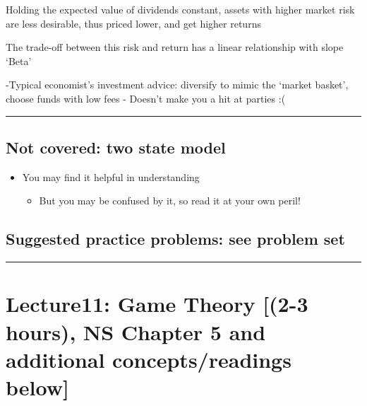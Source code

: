 \documentclass[]{article}
\providecommand{\tightlist}{%
  \setlength{\itemsep}{0pt}\setlength{\parskip}{0pt}}
\begin{document}
\bigskip

Holding the expected value of dividends constant, assets with higher
market risk are less desirable, thus priced lower, and get higher
returns

The trade-off between this risk and return has a linear relationship
with slope `Beta'

\bigskip

-Typical economist's investment advice: diversify to mimic the `market
basket', choose funds with low fees - Doesn't make you a hit at parties
:(

\begin{center}\rule{0.5\linewidth}{\linethickness}\end{center}

\hypertarget{not-covered-two-state-model}{%
\subsection{Not covered: two state
model}\label{not-covered-two-state-model}}

\begin{itemize}
\tightlist
\item
  You may find it helpful in understanding

  \begin{itemize}
  \tightlist
  \item
    But you may be confused by it, so read it at your own peril!
  \end{itemize}
\end{itemize}

\hypertarget{suggested-practice-problems-see-problem-set}{%
\subsection{Suggested practice problems: see problem
set}\label{suggested-practice-problems-see-problem-set}}

\begin{center}\rule{0.5\linewidth}{\linethickness}\end{center}

\hypertarget{lecture11-game-theory-2-3-hours-ns-chapter-5-and-additional-conceptsreadings-below}{%
\section{Lecture11: Game Theory {[}(2-3 hours), NS Chapter 5 and
additional concepts/readings
below{]}}\label{lecture11-game-theory-2-3-hours-ns-chapter-5-and-additional-conceptsreadings-below}}
\end{document}
